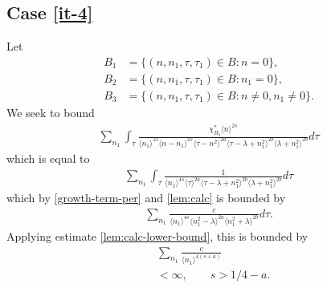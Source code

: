 \documentclass[12pt,reqno]{amsart}
\numberwithin{equation}{section}  %
\begin{document}
\subsection{Case \eqref{it-4}} 
\label{ssec:case-it-4}
Let 
%
%
\begin{align*}
B_1&=\{(n, n_1, \tau, \tau_1)\in B: n=0\},\\
B_2&=\{(n, n_1, \tau, \tau_1)\in B: n_1 = 0 \},\\
B_3&=\{(n, n_1, \tau, \tau_1)\in B: n \neq 0, n_1 \neq 0 \}.
\end{align*} 
%
%
We seek to bound
\begin{equation*}
\begin{split}
  \sum_{n_{1}} \int_{\tau} \frac{\chi^{*}_{B_{3}}
    \langle n \rangle ^{2s}
    }{ \langle n_{1} \rangle^{2s} \langle
    n-n_{1} \rangle ^{2s} \langle \tau - n^{2}    \rangle ^{2a}
    \langle \tau - \lambda + n_{1}^{2} \rangle^{2b}
    \langle  \lambda + n_{1}^{2} \rangle^{2b}  } d \tau  
\end{split}
\end{equation*}
which is equal to
\begin{equation*}
\begin{split}
  \sum_{n_{1}} \int_{\tau} \frac{1}
    { \langle n_{1} \rangle^{4s} \langle \tau    \rangle ^{2a}
    \langle \tau - \lambda + n_{1}^{2} \rangle^{2b}
    \langle  \lambda + n_{1}^{2} \rangle^{2b}  } d \tau  
\end{split}
\end{equation*}
which by \eqref{growth-term-per} and \cref{lem:calc} is bounded by
%
%
\begin{equation*}
\begin{split}
  \sum_{n_{1}} \frac{c}
  { \langle n_{1} \rangle^{4s} \langle n_{1}^{2} - \lambda   \rangle ^{2a}
  \langle n_{1}^{2} + \lambda \rangle^{2b}
     } d \tau  .
\end{split}
\end{equation*}
%
%
Applying estimate \cref{lem:calc-lower-bound}, this is bounded by
\begin{equation*}
\begin{split}
  & \sum_{n_{1}} \frac{c}
  { \langle n_{1} \rangle ^{4(s+a)}} 
  \\
  & < \infty, \qquad s > 1/4 -a.
\end{split}
\end{equation*}
\end{document}
